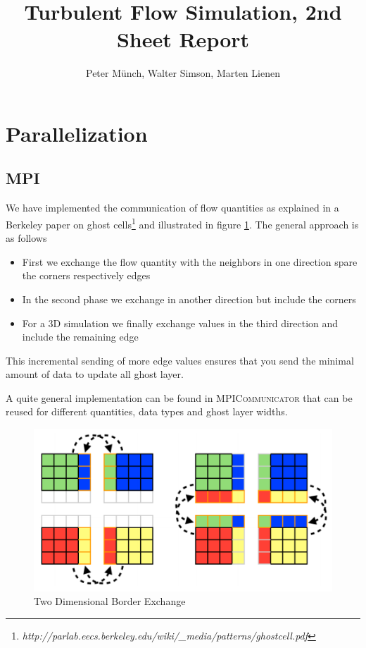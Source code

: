 \documentclass[11pt,a4paper]{article}
\title{Turbulent Flow Simulation, 2nd Sheet Report}
\author{Peter Münch, Walter Simson, Marten Lienen}
\begin{document}
\newcommand{\abl}[2]{\frac{\partial \, #1}{\partial \, #2}}
\newcommand{\abll}[2]{\frac{\partial^2 \, #1}{\partial \, #2^2}}
\newcommand{\ave}[1]{\left\langle#1\right\rangle}
\newcommand{\new}[1]{\textcolor{red}{#1}}

\maketitle

\section{Parallelization}

\subsection{MPI}

We have implemented the communication of flow quantities as explained in a
Berkeley paper on ghost
cells\footnote{\emph{http://parlab.eecs.berkeley.edu/wiki/\_media/patterns/ghostcell.pdf}}
and illustrated in figure \ref{fig:border-exchange}. The general approach is as follows

\begin{itemize}
\item First we exchange the flow quantity with the neighbors in one direction spare the corners respectively edges
\item In the second phase we exchange in another direction but include the corners
\item For a 3D simulation we finally exchange values in the third direction and include the remaining edge
\end{itemize}

This incremental sending of more edge values ensures that you send the minimal
amount of data to update all ghost layer.

A quite general implementation can be found in \textsc{MPICommunicator} that can
be reused for different quantities, data types and ghost layer widths.

\begin{figure}[h]
  \centering
  \includegraphics[width=\textwidth]{border-exchange}
  \caption{Two Dimensional Border Exchange}
  \label{fig:border-exchange}
\end{figure}
\end{document}
